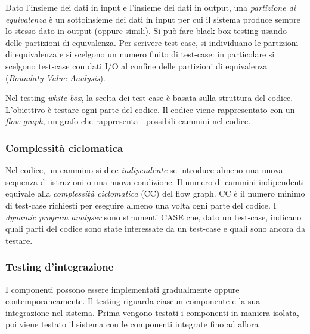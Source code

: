 \documentclass[11pt]{article}
\begin{document}
Dato l'insieme dei dati in input e l'insieme dei dati in 
output, una \textit{partizione di equivalenza} è un sottoinsieme dei dati in input per cui il sistema produce sempre lo 
stesso dato in output (oppure simili). Si può fare black box testing usando delle partizioni di equivalenza.
Per scrivere test-case, si individuano le partizioni di equivalenza e si scelgono un numero finito di test-case: in 
particolare si scelgono test-case con dati I/O al confine delle partizioni di equivalenza (\textit{Boundaty Value Analysis}).

Nel testing \textit{white box}, la scelta dei test-case è basata sulla struttura del codice. L'obiettivo è testare ogni 
parte del codice. Il codice viene rappresentato con un \textit{flow graph}, un grafo che rappresenta i possibili cammini 
nel codice.
\subsubsection{Complessità ciclomatica}
Nel codice, un cammino si dice \textit{indipendente} se introduce almeno una nuova sequenza di istruzioni o una nuova 
condizione. Il numero di cammini indipendenti equivale alla \textit{complessità ciclomatica} (CC) del flow graph. CC è 
il numero minimo di test-case richiesti per eseguire almeno una volta ogni parte del codice. I \textit{dynamic program
analyser} sono strumenti CASE che, dato un test-case, indicano quali parti del codice sono state interessate da un 
test-case e quali sono ancora da testare.
\subsubsection*{Testing d'integrazione}
I componenti possono essere implementati gradualmente oppure contemporaneamente. Il testing riguarda ciascun componente 
e la sua integrazione nel sistema. Prima vengono testati i componenti in maniera isolata, poi viene testato il sistema 
con le componenti integrate fino ad allora 
\end{document}
